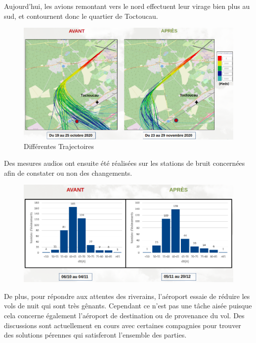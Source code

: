 Aujourd'hui, les avions remontant vers le nord effectuent leur virage bien plus au sud, et contournent donc le quartier de Toctoucau.\newline

\begin{figure}[hbt!]
  \centering
  \includegraphics[width=13.5cm]{Images/trajectoires_avant_apres.png}\newline
  \caption{Différentes Trajectoires}
  \label{fig:trajectoires}
\end{figure}

Des mesures audios ont ensuite été réalisées sur les stations de bruit concernées afin de constater ou non des changements.

\begin{figure}[hbt!]
  \centering
  \includegraphics[width=14cm]{Images/bruit_avant_apres.png}\newline
  \label{fig:Mesures audios}
\end{figure}

De plus, pour répondre aux attentes des riverains, l'aéroport essaie de réduire les vols de nuit qui sont très gênants. Cependant ce n'est pas une tâche aisée puisque cela concerne également l'aéroport de destination ou de provenance du vol. Des discussions sont actuellement en cours avec certaines compagnies pour trouver des solutions pérennes qui satisferont l'ensemble des parties.\newline

